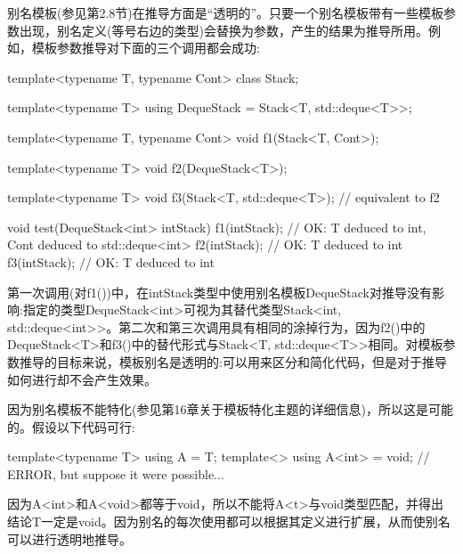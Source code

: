 别名模板(参见第2.8节)在推导方面是“透明的”。只要一个别名模板带有一些模板参数出现，别名定义(等号右边的类型)会替换为参数，产生的结果为推导所用。例如，模板参数推导对下面的三个调用都会成功:

\begin{cpp}
template<typename T, typename Cont>
class Stack;

template<typename T>
using DequeStack = Stack<T, std::deque<T>>;

template<typename T, typename Cont>
void f1(Stack<T, Cont>);

template<typename T>
void f2(DequeStack<T>);

template<typename T>
void f3(Stack<T, std::deque<T>); // equivalent to f2

void test(DequeStack<int> intStack)
{
	f1(intStack); // OK: T deduced to int, Cont deduced to std::deque<int>
	f2(intStack); // OK: T deduced to int
	f3(intStack); // OK: T deduced to int
}
\end{cpp}

第一次调用(对f1())中，在intStack类型中使用别名模板DequeStack对推导没有影响:指定的类型DequeStack<int>可视为其替代类型Stack<int, std::deque<int>{}>。第二次和第三次调用具有相同的涂掉行为，因为f2()中的DequeStack<T>和f3()中的替代形式与Stack<T, std::deque<T>{}>相同。对模板参数推导的目标来说，模板别名是透明的:可以用来区分和简化代码，但是对于推导如何进行却不会产生效果。

因为别名模板不能特化(参见第16章关于模板特化主题的详细信息)，所以这是可能的。假设以下代码可行:

\begin{cpp}
template<typename T> using A = T;
template<> using A<int> = void; // ERROR, but suppose it were possible...
\end{cpp}

因为A<int>和A<void>都等于void，所以不能将A<t>与void类型匹配，并得出结论T一定是void。因为别名的每次使用都可以根据其定义进行扩展，从而使别名可以进行透明地推导。


























